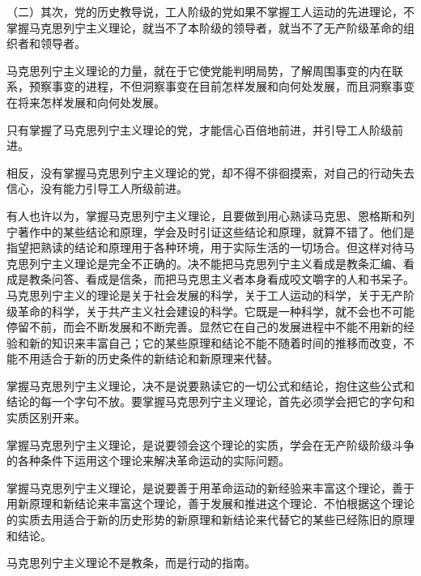 （二）其次，党的历史教导说，工人阶级的党如果不掌握工人运动的先进理论，不掌握马克思列宁主义理论，就当不了本阶级的领导者，就当不了无产阶级革命的组织者和领导者。

马克思列宁主义理论的力量，就在于它使党能判明局势，了解周围事变的内在联系，预察事变的进程，不但洞察事变在目前怎样发展和向何处发展，而且洞察事变在将来怎样发展和向何处发展。

只有掌握了马克思列宁主义理论的党，才能信心百倍地前进，并引导工人阶级前进。

相反，没有掌握马克思列宁主义理论的党，却不得不徘徊摸索，对自己的行动失去信心，没有能力引导工人所级前进。

有人也许以为，掌握马克思列宁主义理论，且要做到用心熟读马克思、恩格斯和列宁著作中的某些结论和原理，学会及时引证这些结论和原理，就算不错了。他们是指望把熟读的结论和原理用于各种环境，用于实际生活的一切场合。但这样对待马克思列宁主义理论是完全不正确的。决不能把马克思列宁主义看成是教条汇编、看成是教条问答、看成是信条，而把马克思主义者本身看成咬文嚼字的人和书呆子。马克思列宁主义的理论是关于社会发展的科学，关于工人运动的科学，关于无产阶级革命的科学，关于共产主义社会建设的科学。它既是一种科学，就不会也不可能停留不前，而会不断发展和不断完善。显然它在自己的发展进程中不能不用新的经验和新的知识来丰富自己；它的某些原理和结论不能不随着时间的推移而改变，不能不用适合于新的历史条件的新结论和新原理来代替。

掌握马克思列宁主义理论，决不是说要熟读它的一切公式和结论，抱住这些公式和结论的每一个字句不放。要掌握马克思列宁主义理论，首先必须学会把它的字句和实质区别开来。

掌握马克思列宁主义理论，是说要领会这个理论的实质，学会在无产阶级阶级斗争的各种条件下运用这个理论来解决革命运动的实际问题。

掌握马克思列宁主义理论，是说要善于用革命运动的新经验来丰富这个理论，善于用新原理和新结论来丰富这个理论，善于发展和推进这个理论．不怕根据这个理论的实质去用适合于新的历史形势的新原理和新结论来代替它的某些已经陈旧的原理和结论。

马克思列宁主义理论不是教条，而是行动的指南。

